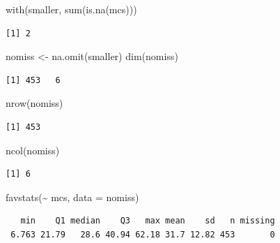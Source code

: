 \documentclass[
  ngerman,
]{scrbook}
\newenvironment{Shaded}{\begin{snugshade}}{\end{snugshade}}
\newcommand{\AttributeTok}[1]{\textcolor[rgb]{0.77,0.63,0.00}{#1}}
\newcommand{\FunctionTok}[1]{\textcolor[rgb]{0.00,0.00,0.00}{#1}}
\newcommand{\NormalTok}[1]{#1}
\newcommand{\OtherTok}[1]{\textcolor[rgb]{0.56,0.35,0.01}{#1}}
\newcommand{\SpecialCharTok}[1]{\textcolor[rgb]{0.00,0.00,0.00}{#1}}
\begin{document}
\begin{Shaded}
\begin{Highlighting}[]
\FunctionTok{with}\NormalTok{(smaller, }\FunctionTok{sum}\NormalTok{(}\FunctionTok{is.na}\NormalTok{(mcs)))}
\end{Highlighting}
\end{Shaded}

\begin{verbatim}
[1] 2
\end{verbatim}

\begin{Shaded}
\begin{Highlighting}[]
\NormalTok{nomiss }\OtherTok{\textless{}{-}} \FunctionTok{na.omit}\NormalTok{(smaller)}
\FunctionTok{dim}\NormalTok{(nomiss)}
\end{Highlighting}
\end{Shaded}

\begin{verbatim}
[1] 453   6
\end{verbatim}

\begin{Shaded}
\begin{Highlighting}[]
\FunctionTok{nrow}\NormalTok{(nomiss)}
\end{Highlighting}
\end{Shaded}

\begin{verbatim}
[1] 453
\end{verbatim}

\begin{Shaded}
\begin{Highlighting}[]
\FunctionTok{ncol}\NormalTok{(nomiss)}
\end{Highlighting}
\end{Shaded}

\begin{verbatim}
[1] 6
\end{verbatim}

\begin{Shaded}
\begin{Highlighting}[]
\FunctionTok{favstats}\NormalTok{(}\SpecialCharTok{\textasciitilde{}}\NormalTok{ mcs, }\AttributeTok{data =}\NormalTok{ nomiss)}
\end{Highlighting}
\end{Shaded}

\begin{verbatim}
   min    Q1 median    Q3   max mean    sd   n missing
 6.763 21.79   28.6 40.94 62.18 31.7 12.82 453       0
\end{verbatim}
\end{document}
